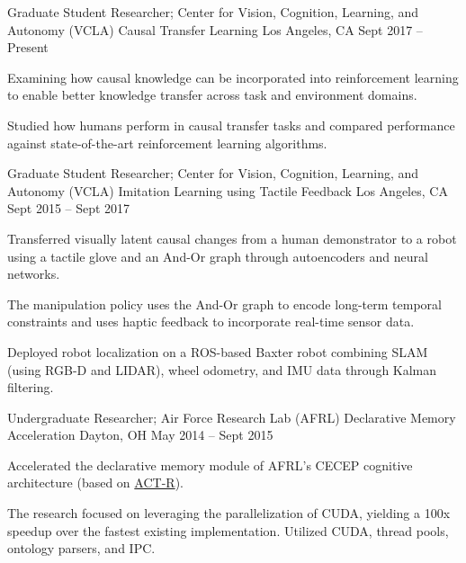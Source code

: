 


\begin{cventries}


\cventry
{Graduate Student Researcher; Center for Vision, Cognition, Learning, and Autonomy (VCLA)}
{Causal Transfer Learning}
{Los Angeles, CA}
{Sept 2017 – Present}
{
\begin{cvitems}
\item Examining how causal knowledge can be incorporated into reinforcement learning to enable better knowledge transfer across task and environment domains.
\item Studied how humans perform in causal transfer tasks and compared performance against state-of-the-art reinforcement learning algorithms.
\end{cvitems}
}


\cventry
{Graduate Student Researcher; Center for Vision, Cognition, Learning, and Autonomy (VCLA)}
{Imitation Learning using Tactile Feedback}
{Los Angeles, CA}
{Sept 2015 – Sept 2017}
{
\begin{cvitems}
\item Transferred visually latent causal changes from a human demonstrator to a robot using a tactile glove and an And-Or graph through autoencoders and neural networks.
\item The manipulation policy uses the And-Or graph to encode long-term temporal constraints and uses haptic feedback to incorporate real-time sensor data.
\item Deployed robot localization on a ROS-based Baxter robot combining SLAM (using RGB-D and LIDAR), wheel odometry, and IMU data through Kalman filtering.
\end{cvitems}
}


\cventry
{Undergraduate Researcher; Air Force Research Lab (AFRL)}
{Declarative Memory Acceleration}
{Dayton, OH}
{May 2014 – Sept 2015}
{
\begin{cvitems}
\item Accelerated the declarative memory module of AFRL's CECEP cognitive architecture (based on \href{http://act-r.psy.cmu.edu/}{ACT-R}).
\item The research focused on leveraging the parallelization of CUDA, yielding a 100x speedup over the fastest existing implementation. Utilized CUDA, thread pools, ontology parsers, and IPC.
\end{cvitems}
}


\end{cventries}